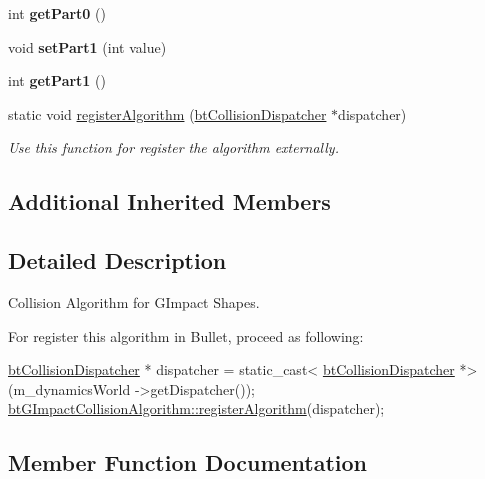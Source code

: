 \begin{DoxyCompactItemize}
int {\bfseries get\+Part0} ()
\item 
\mbox{\label{classbtGImpactCollisionAlgorithm_a8331035e2532a2380fb9852e130fa72e}} 
void {\bfseries set\+Part1} (int value)
\item 
\mbox{\label{classbtGImpactCollisionAlgorithm_aed04922dcbc9e78ab2af970628037684}} 
int {\bfseries get\+Part1} ()
\item 
\mbox{\label{classbtGImpactCollisionAlgorithm_a378bceae2110e29618abf9264a9510e0}} 
static void \hyperlink{classbtGImpactCollisionAlgorithm_a378bceae2110e29618abf9264a9510e0}{register\+Algorithm} (\hyperlink{classbtCollisionDispatcher}{bt\+Collision\+Dispatcher} $\ast$dispatcher)
\begin{DoxyCompactList}\small\item\em Use this function for register the algorithm externally. \end{DoxyCompactList}\end{DoxyCompactItemize}
\subsection*{Additional Inherited Members}


\subsection{Detailed Description}
Collision Algorithm for G\+Impact Shapes. 

For register this algorithm in Bullet, proceed as following\+: 
\begin{DoxyCode}
\hyperlink{classbtCollisionDispatcher}{btCollisionDispatcher} * dispatcher = \textcolor{keyword}{static\_cast<}
      \hyperlink{classbtCollisionDispatcher}{btCollisionDispatcher} *\textcolor{keyword}{>}(m\_dynamicsWorld ->getDispatcher());
\hyperlink{classbtGImpactCollisionAlgorithm_a8ddef653ddc1afa7c976abb1ecaf0b98}{btGImpactCollisionAlgorithm::registerAlgorithm}(dispatcher);
\end{DoxyCode}
 

\subsection{Member Function Documentation}
\mbox{\label{classbtGImpactCollisionAlgorithm_a1cc907bcb394f7a95d609b1b56a5490e}} 
